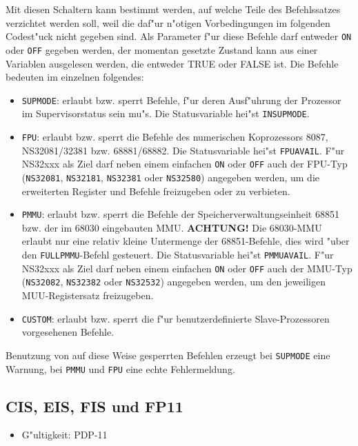 \documentclass[12pt,a4paper,twoside]{report}
\makeatletter
\newcommand{\bb}[1]{{\bf #1}}
\newcommand{\tty}[1]{{\tt #1}}
\newcommand{\ttindex}[1]{\index{#1@{\tt #1}}}
\makeatother
\begin{document}
Mit diesen Schaltern kann bestimmt werden, auf welche Teile des
Befehlssatzes verzichtet werden soll, weil die daf"ur n"otigen
Vorbedingungen im folgenden Codest"uck nicht gegeben sind.  Als
Parameter f"ur diese Befehle darf entweder \tty{ON} oder \tty{OFF} gegeben werden,
der momentan gesetzte Zustand kann aus einer Variablen ausgelesen
werden, die entweder TRUE oder FALSE ist.  Die Befehle bedeuten im einzelnen
folgendes:
\begin{itemize}
\item{\tty{SUPMODE}: erlaubt bzw. sperrt Befehle, f"ur deren Ausf"uhrung
      der Prozessor im Supervisorstatus sein mu"s.  Die Statusvariable
      hei"st \tty{INSUPMODE}.}
\item{\tty{FPU}: erlaubt bzw. sperrt die Befehle des numerischen Koprozessors
      8087, NS32081/32381 bzw. 68881/68882.  Die Statusvariable hei"st \tty{FPUAVAIL}.
      F"ur NS32xxx als Ziel darf neben einem einfachen \tty{ON} oder \tty{OFF}
      auch der FPU-Typ (\tty{NS32081}, \tty{NS32181}, \tty{NS32381} oder \tty{NS32580})
      angegeben werden, um die erweiterten Register und Befehle freizugeben oder
      zu verbieten.}
\item{\tty{PMMU}: erlaubt bzw. sperrt die Befehle der Speicherverwaltungseinheit
      68851 bzw. der im 68030 eingebauten MMU.  \bb{ACHTUNG!} Die 68030-MMU
      erlaubt nur eine relativ kleine Untermenge der 68851-Befehle, dies wird
      "uber den \tty{FULLPMMU}-Befehl gesteuert.  Die Statusvariable hei"st
      \tty{PMMUAVAIL}. F"ur NS32xxx als Ziel darf neben einem einfachen \tty{ON}
      oder \tty{OFF} auch der MMU-Typ (\tty{NS32082}, \tty{NS32382} oder \tty{NS32532})
      angegeben werden, um den jeweiligen MUU-Registersatz freizugeben.}
\item{\tty{CUSTOM}: erlaubt bzw. sperrt die f"ur benutzerdefinierte Slave-Prozessoren
      vorgesehenen Befehle.}
\end{itemize}
Benutzung von auf diese Weise gesperrten Befehlen erzeugt bei \tty{SUPMODE}
eine Warnung, bei \tty{PMMU} und \tty{FPU} eine echte Fehlermeldung.


\subsection{CIS, EIS, FIS und FP11}
\ttindex{CIS}\ttindex{EIS}\ttindex{FIS}\ttindex{FP11}

{\em
\begin{itemize}
\item{G"ultigkeit: PDP-11}
\end{itemize}
}
\end{document}
